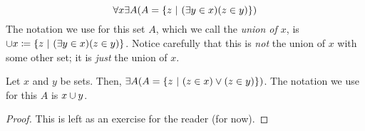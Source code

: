 \begin{axiom}[Union]\label{ax:union}
    \vspace{-\abovedisplayskip}
    \[
        \forall x \exists A \pn*{A = \set*{z \suchthat \pn*{\exists y \in x}\pn*{z \in y}}}
    \]
    The notation we use for this set \(A\), which we call the \emph{union of \(x\)},
    is \(\union x \defn \set*{z \suchthat \pn*{\exists y \in x}\pn*{z \in y}}\).
    Notice carefully that this is \emph{not} the union of \(x\) with some other set;
    it is \emph{just} the union of \(x\).
\end{axiom}

\begin{theorem}
    Let \(x\) and \(y\) be sets.
    Then, \(\exists A \pn*{A = \set*{z \suchthat \pn*{z \in x} \join \pn*{z \in y}}}\).
    The notation we use for this \(A\) is \(x \cup y\).
\end{theorem}
\begin{proof}
    This is left as an exercise for the reader (for now).
\end{proof}



